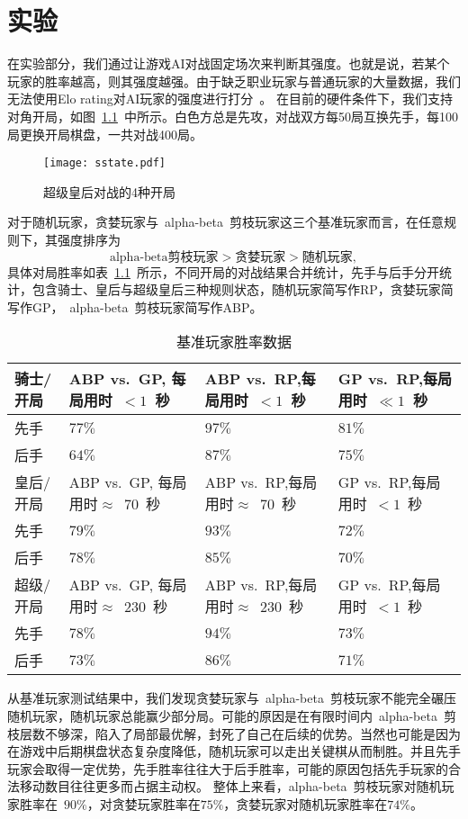 \chapter{实验}
\label{chap:experiment}
在实验部分，我们通过让游戏AI对战固定场次来判断其强度。也就是说，若某个玩家的胜率越高，则其强度越强。由于缺乏职业玩家与普通玩家的大量数据，我们无法使用Elo rating对AI玩家的强度进行打分~\cite{glickman1999rating}。
在目前的硬件条件下，我们支持对角开局，如图~\ref{fig:sstate}~中所示。白色方总是先攻，对战双方每50局互换先手，每100局更换开局棋盘，一共对战400局。
\begin{figure}[!b]
    \centering
    \texttt{[image: sstate.pdf]}
    \caption[sstate]{%
        超级皇后对战的4种开局%
      }
    \label{fig:sstate}
\end{figure}
对于随机玩家，贪婪玩家与~alpha-beta~剪枝玩家这三个基准玩家而言，在任意规则下，其强度排序为
\[
    \text{alpha-beta剪枝玩家} > \text{贪婪玩家} > \text{随机玩家} ,
\]
具体对局胜率如表~\ref{table:baseresult}~所示，不同开局的对战结果合并统计，先手与后手分开统计，包含骑士、皇后与超级皇后三种规则状态，随机玩家简写作RP，贪婪玩家简写作GP，~alpha-beta~剪枝玩家简写作ABP。
\begin{table}[!t]
    \centering
    \caption[baseresult]{基准玩家胜率数据}
    \begin{tabular}{p{2cm}<{\centering} p{4cm}<{\centering} p{4cm}<{\centering} p{4cm}<{\centering}}
    \hline
    骑士/开局 & ABP vs.\  GP, 每局用时~$<1$~秒 & ABP vs.\  RP,每局用时~$<1$~秒 & GP vs.\  RP,每局用时~$\ll1$~秒 \\ \hline
    先手 & $77\%$ & $97\%$ & $81\%$\\ 
    后手 & $64\%$ & $87\%$ & $75\%$\\ \hline
    皇后/开局 & ABP vs.\  GP, 每局用时$\approx$~70~秒 & ABP vs.\  RP,每局用时$\approx$~70~秒 & GP vs.\  RP,每局用时~$<1$~秒 \\ \hline
    先手 & $79\%$ & $93\%$ & $72\%$\\ 
    后手 & $78\%$ & $85\%$ & $70\%$\\ \hline
    超级/开局 & ABP vs.\  GP, 每局用时$\approx$~230~秒 & ABP vs.\  RP,每局用时$\approx$~230~秒 & GP vs.\  RP,每局用时~$<1$~秒 \\ \hline
    先手 & $78\%$ & $94\%$ & $73\%$\\ 
    后手 & $73\%$ & $86\%$ & $71\%$\\ \hline
    \end{tabular}
    \label{table:baseresult}
  \end{table}
从基准玩家测试结果中，我们发现贪婪玩家与~alpha-beta~剪枝玩家不能完全碾压随机玩家，随机玩家总能赢少部分局。可能的原因是在有限时间内~alpha-beta~剪枝层数不够深，陷入了局部最优解，封死了自己在后续的优势。当然也可能是因为在游戏中后期棋盘状态复杂度降低，随机玩家可以走出关键棋从而制胜。并且先手玩家会取得一定优势，先手胜率往往大于后手胜率，可能的原因包括先手玩家的合法移动数目往往更多而占据主动权。
整体上来看，alpha-beta~剪枝玩家对随机玩家胜率在~$90\%$，对贪婪玩家胜率在$75\%$，贪婪玩家对随机玩家胜率在$74\%$。
